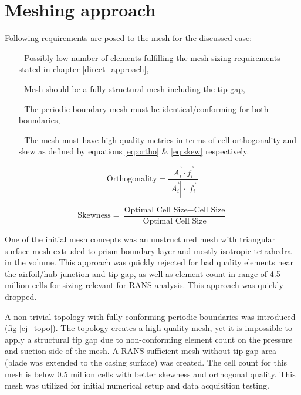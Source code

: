 \section{Meshing approach} \label{mesh}
Following requirements are posed to the mesh for the discussed case:
\begin{itemize}
\item[-]Possibly low number of elements fulfilling the mesh sizing requirements stated in chapter \ref{direct_approach},
\item[-] Mesh should be a fully structural mesh including the tip gap,
\item[-] The periodic boundary mesh must be identical/conforming for both boundaries,
\item[-] The mesh must have high quality metrics in terms of cell orthogonality and skew as defined by equations \ref{eq:ortho} \& \ref{eq:skew} respectively.
\end{itemize}


\begin{equation} \label{eq:ortho}
\text{Orthogonality} = \frac{\vec{A_i} \cdot \vec{f_i}}{|\vec{A_i}| \cdot |\vec{f_i}|}
\end{equation}


\begin{equation} \label{eq:skew}
\text{Skewness} = \frac{\text{Optimal Cell Size} - \text{Cell Size}}{\text{Optimal Cell Size}}
\end{equation}


One of the initial mesh concepts was an unstructured mesh with triangular surface mesh extruded to prism boundary layer and mostly isotropic tetrahedra in the volume. This approach was quickly rejected for bad quality elements near the airfoil/hub junction and tip gap, as well as element count in range of 4.5 million cells for sizing relevant for RANS analysis. This approach was quickly dropped.

A non-trivial topology with fully conforming periodic boundaries was introduced (fig \ref{cj_topo}). The topology creates a high quality mesh, yet it is impossible to apply a structural tip gap due to non-conforming element count on the pressure and suction side of the mesh. A RANS sufficient mesh without tip gap area (blade was extended to the casing surface) was created. The cell count for this mesh is below 0.5 million cells with better skewness and orthogonal quality. This mesh was utilized for initial numerical setup and data acquisition testing.

